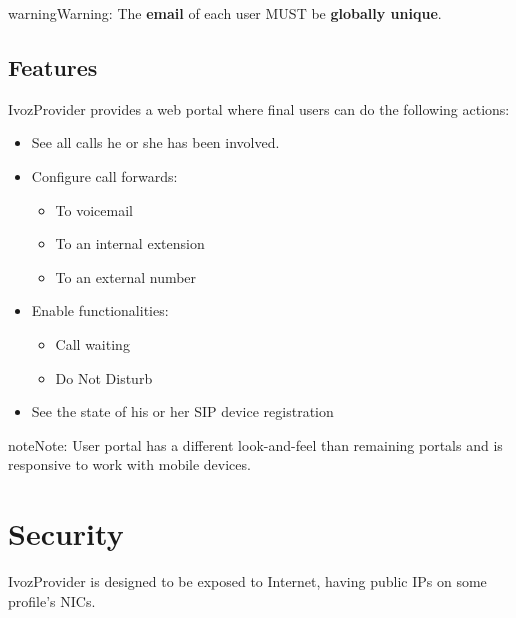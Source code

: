 \documentclass[letterpaper,10pt,english]{sphinxmanual}
\begin{document}
\begin{notice}{warning}{Warning:}
The \textbf{email} of each user MUST be \textbf{globally unique}.
\end{notice}


\section{Features}
\label{user_portal/features::doc}\label{user_portal/features:features}
IvozProvider provides a web portal where final users can do the following
actions:
\begin{itemize}
\item {} 
See all calls he or she has been involved.

\item {} 
Configure call forwards:
\begin{itemize}
\item {} 
To voicemail

\item {} 
To an internal extension

\item {} 
To an external number

\end{itemize}

\item {} 
Enable functionalities:
\begin{itemize}
\item {} 
Call waiting

\item {} 
Do Not Disturb

\end{itemize}

\item {} 
See the state of his or her SIP device registration

\end{itemize}

\begin{notice}{note}{Note:}
User portal has a different look-and-feel than remaining portals and is responsive to work with mobile devices.
\end{notice}


\chapter{Security}
\label{security_and_maintenance/security/index:security}\label{security_and_maintenance/security/index::doc}
IvozProvider is designed to be exposed to Internet, having public IPs on some profile's NICs.
\end{document}

